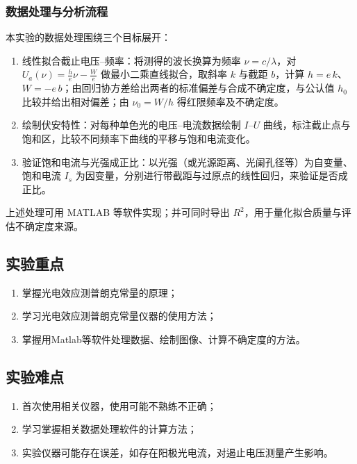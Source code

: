 \documentclass[]{../../templates/Report}%
\begin{document}
\subsubsection{数据处理与分析流程}
本实验的数据处理围绕三个目标展开：
\begin{enumerate}[label=(\roman*)]
    \item 线性拟合截止电压–频率：将测得的波长换算为频率 $\nu=c/\lambda$，对 $U_a(\nu)=\tfrac{h}{e}\nu-\tfrac{W}{e}$ 做最小二乘直线拟合，取斜率 $k$ 与截距 $b$，计算 $h=e\,k$、$W=-e\,b$；由回归协方差给出两者的标准偏差与合成不确定度，与公认值 $h_0$ 比较并给出相对偏差；由 $\nu_0=W/h$ 得红限频率及不确定度。
    \item 绘制伏安特性：对每种单色光的电压–电流数据绘制 $I$–$U$ 曲线，标注截止点与饱和区，比较不同频率下曲线的平移与饱和电流变化。
    \item 验证饱和电流与光强成正比：以光强（或光源距离、光阑孔径等）为自变量、饱和电流 $I_s$ 为因变量，分别进行带截距与过原点的线性回归，来验证是否成正比。
\end{enumerate}
上述处理可用 MATLAB 等软件实现；并可同时导出 $R^2$，用于量化拟合质量与评估不确定度来源。



\subsection{实验重点}
\begin{enumerate}
    \item 掌握光电效应测普朗克常量的原理；
    \item 学习光电效应测普朗克常量仪器的使用方法；
    \item 掌握用Matlab等软件处理数据、绘制图像、计算不确定度的方法。
\end{enumerate}

\subsection{实验难点}
\begin{enumerate}
    \item 首次使用相关仪器，使用可能不熟练不正确；
    \item 学习掌握相关数据处理软件的计算方法；
    \item 实验仪器可能存在误差，如存在阳极光电流，对遏止电压测量产生影响。
\end{enumerate}
\end{document}
